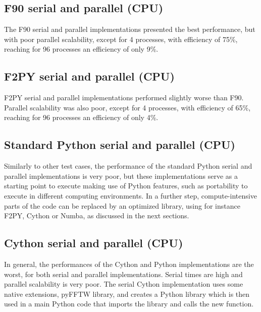 %
%
%
\subsection{F90 serial and parallel (CPU)}
\label{sec_fftf90}

The F90 serial and parallel implementations presented the best performance, but with poor parallel scalability, except for 4 processes, with efficiency of 75\%, reaching for 96 processes an efficiency of only 9\%.  

%
%
%
\subsection{F2PY serial and parallel (CPU)}
\label{sec_fftf2py}

F2PY serial and parallel implementations performed slightly worse than F90. Parallel scalability was also poor, except for 4 processes, with efficiency of 65\%, reaching for 96 processes an efficiency of only 4\%.  

%
%
%
\subsection{Standard Python serial and parallel (CPU)}
\label{sec_fftpyth}

Similarly to other test cases, the performance of the standard Python serial and parallel implementations is very poor, but these implementations serve as a starting point to execute making use of Python features, such as portability to execute in different computing environments. In a further step, compute-intensive parts of the code can be replaced by an optimized library, using for instance F2PY, Cython or Numba, as discussed in the next sections.

%
%
%
\subsection{Cython serial and parallel (CPU)}
\label{sec_fftcyth}

In general, the performances of the Cython and Python implementations are the worst, for both serial and parallel implementations. Serial times are high and parallel scalability is very poor. The serial Cython implementation uses some native extensions, pyFFTW library, and creates a Python library which is then used in a main Python code that imports the library and calls the new function. 

